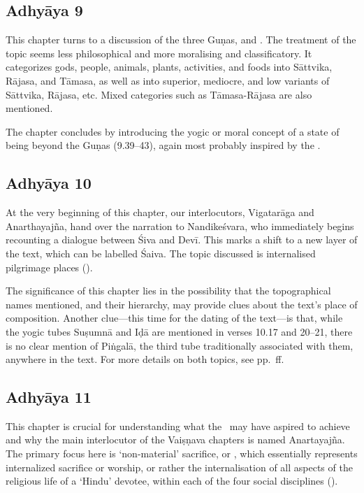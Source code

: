 \subsection*{Adhyāya 9}\label{contents_of_ch09}
This chapter turns to a discussion of the three Guṇas,  and .
The treatment of the topic seems less philosophical and more moralising and classificatory.
It categorizes gods, people, animals, plants, activities, and foods into Sāttvika, Rājasa, 
and Tāmasa, as well as into superior, mediocre, and low variants of Sāttvika, Rājasa, etc.
Mixed categories such as Tāmasa-Rājasa are also mentioned. 

The chapter concludes by introducing the yogic or moral concept of a state of being 
beyond the Guṇas (9.39--43), again most probably inspired by the \MBH.

\subsection*{Adhyāya 10}\label{contents_of_ch10}
At the very beginning of this chapter, our interlocutors, Vigatarāga and Anarthayajña,
hand over the narration to Nandikeśvara, who immediately begins recounting
a dialogue between Śiva and Devī. This marks a shift to a new layer of the text,
which can be labelled Śaiva. The topic discussed is internalised pilgrimage places ().

The significance of this chapter lies in the possibility that the topographical
names mentioned, and their hierarchy, may provide clues about the text's
place of composition. Another clue---this time for the dating of the text---is that,
while the yogic tubes Suṣumnā and Iḍā are mentioned in verses 10.17 and 20--21,
there is no clear mention of Piṅgalā, the third tube traditionally associated with them,
anywhere in the text. For more details on both topics, see pp.~\pageref{provenance}ff.

\subsection*{Adhyāya 11}\label{contents_of_ch11}
This chapter is crucial for understanding what the \VSS\ may have aspired to achieve and 
why the main interlocutor of the Vaiṣṇava chapters is named Anartayajña. The primary
focus here is `non-material' sacrifice, or , which essentially
represents internalized sacrifice or worship, or rather the internalisation of all aspects of
the religious life of a `Hindu' devotee, within each of the four social disciplines ().

